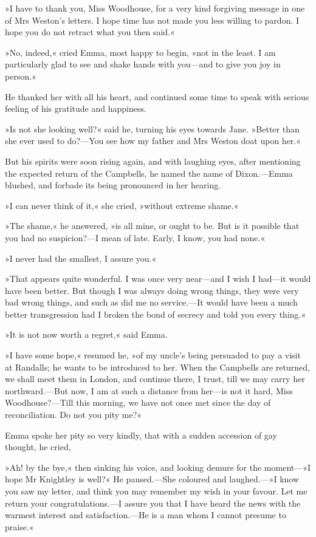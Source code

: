 »I have to thank you, Miss Woodhouse, for a very kind forgiving message in one of Mrs Weston's letters. I hope time has not made you less willing to pardon. I hope you do not retract what you then said.«

»No, indeed,« cried Emma, most happy to begin, »not in the least. I am particularly glad to see and shake hands with you—and to give you joy in person.«

He thanked her with all his heart, and continued some time to speak with serious feeling of his gratitude and happiness.

»Is not she looking well?« said he, turning his eyes towards Jane. »Better than she ever used to do?—You see how my father and Mrs Weston doat upon her.«

But his spirits were soon rising again, and with laughing eyes, after mentioning the expected return of the Campbells, he named the name of Dixon.—Emma blushed, and forbade its being pronounced in her hearing.

»I can never think of it,« she cried, »without extreme shame.«

»The shame,« he answered, »is all mine, or ought to be. But is it possible that you had no suspicion?—I mean of late. Early, I know, you had none.«

»I never had the smallest, I assure you.«

»That appears quite wonderful. I was once very near—and I wish I had—it would have been better. But though I was always doing wrong things, they were very bad wrong things, and such as did me no service.—It would have been a much better transgression had I broken the bond of secrecy and told you every thing.«

»It is not now worth a regret,« said Emma.

»I have some hope,« resumed he, »of my uncle's being persuaded to pay a visit at Randalls; he wants to be introduced to her. When the Campbells are returned, we shall meet them in London, and continue there, I trust, till we may carry her northward.—But now, I am at such a distance from her—is not it hard, Miss Woodhouse?—Till this morning, we have not once met since the day of reconciliation. Do not you pity me?«

Emma spoke her pity so very kindly, that with a sudden accession of gay thought, he cried,

»Ah! by the bye,« then sinking his voice, and looking demure for the moment—»I hope Mr Knightley is well?« He paused.—She coloured and laughed.\allowbreak—»I know you saw my letter, and think you may remember my wish in your favour. Let me return your congratulations.—I assure you that I have heard the news with the warmest interest and satisfaction.—He is a man whom I cannot presume to praise.«

